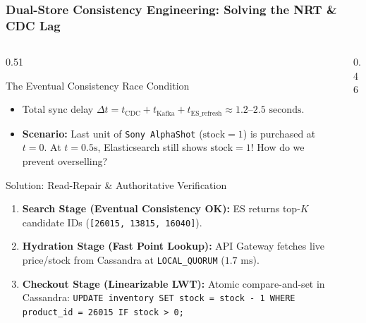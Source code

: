 \documentclass[aspectratio=169]{beamer}
\begin{document}
\begin{frame}
\frametitle{Dual-Store Consistency Engineering: Solving the NRT \& CDC Lag}
\begin{columns}[T]
\begin{column}{0.51\textwidth}
\begin{alertblock}{\tiny The Eventual Consistency Race Condition}
\tiny
\begin{itemize}
    \item Total sync delay $\Delta t = t_{\text{CDC}} + t_{\text{Kafka}} + t_{\text{ES\_refresh}} \approx 1.2\text{--}2.5\text{ seconds}$.
    \item \textbf{Scenario:} Last unit of \texttt{Sony AlphaShot} ($\text{stock}=1$) is purchased at $t=0$. At $t=0.5\text{s}$, Elasticsearch still shows $\text{stock}=1$! How do we prevent overselling?
\end{itemize}
\end{alertblock}
\begin{block}{\tiny Solution: Read-Repair \& Authoritative Verification}
\tiny
\begin{enumerate}
    \item \textbf{Search Stage (Eventual Consistency OK):} ES returns top-$K$ candidate IDs (\texttt{[26015, 13815, 16040]}).
    \item \textbf{Hydration Stage (Fast Point Lookup):} API Gateway fetches live price/stock from Cassandra at \texttt{LOCAL\_QUORUM} ($1.7\text{ ms}$).
    \item \textbf{Checkout Stage (Linearizable LWT):} Atomic compare-and-set in Cassandra:
    \texttt{UPDATE inventory SET stock = stock - 1 WHERE product\_id = 26015 IF stock > 0;}
\end{enumerate}
\end{block}
\end{column}
\begin{column}{0.46\textwidth}
\centering
\vspace{0.1cm}
\end{column}
\end{columns}
\end{frame}
\end{document}
